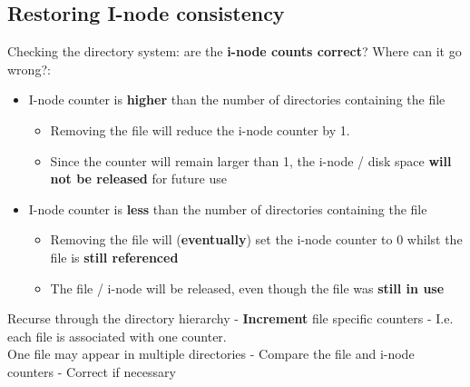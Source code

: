 \documentclass{article}
\begin{document}
\subsection{Restoring I-node consistency}
\begin{flushleft}
Checking the directory system: are the \textbf{i-node counts correct}? Where can it go wrong?:
\begin{itemize}
	\item I-node counter is \textbf{higher} than the number of directories containing the file
	\begin{itemize}
		\item Removing the file will reduce the i-node counter by 1.
		\item Since the counter will remain larger than 1, the i-node / disk space \textbf{will not be released} for future use
	\end{itemize}
	\item I-node counter is \textbf{less} than the number of directories containing the file
	\begin{itemize}
		\item Removing the file will (\textbf{eventually}) set the i-node counter to 0 whilst the file is \textbf{still referenced}
		\item The file / i-node will be released, even though the file was \textbf{still in use}
	\end{itemize}
\end{itemize}
 Recurse through the directory hierarchy - \textbf{Increment} file specific counters - I.e. each file is associated with one counter.\\
 One file may appear in multiple directories - Compare the file and i-node counters - Correct if necessary
\end{flushleft}
\end{document}
